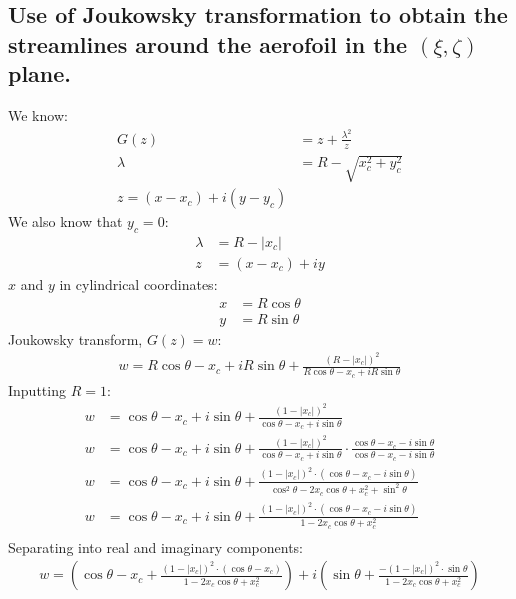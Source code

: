 \subsection{Use of Joukowsky transformation to obtain the streamlines around the aerofoil in the $\left(\xi, \zeta \right)$ plane.}
We know:
\begin{align}
    G(z)    & = z + \frac{\lambda^2}{z}  \\
    \lambda & = R - \sqrt{x_c^2 + y_c^2} \\
    z = \left(x-x_c\right) + i\left(y-y_c\right)
\end{align}
We also know that $y_c = 0$:
\begin{align}
    \lambda & = R - \left| x_c \right|  \\
    z       & = \left(x-x_c\right) + iy
\end{align}
$x$ and $y$ in cylindrical coordinates:
\begin{align}
    x & = R\cos\theta \\
    y & = R\sin\theta
\end{align}
Joukowsky transform, $G(z) = w$:
\begin{align}
    w = R\cos\theta - x_c + iR\sin\theta + \frac{\left(R-\left|x_c\right|\right)^2}{R\cos\theta - x_c + iR\sin\theta}
\end{align}
Inputting $R=1$:
\begin{align}
    w & = \cos\theta - x_c + i\sin\theta + \frac{\left(1-\left|x_c\right|\right)^2}{\cos\theta - x_c + i\sin\theta}                                                                             \\
    w & = \cos\theta - x_c + i\sin\theta + \frac{\left(1-\left|x_c\right|\right)^2}{\cos\theta - x_c + i\sin\theta} \cdot \frac{\cos\theta - x_c - i\sin\theta}{\cos\theta - x_c - i\sin\theta} \\
    w & = \cos\theta - x_c + i\sin\theta + \frac{\left(1-\left|x_c\right|\right)^2 \cdot \left(\cos\theta - x_c - i\sin\theta\right)}{\cos^2\theta -2x_c\cos\theta + x_c^2 + \sin^2\theta}      \\
    w & = \cos\theta - x_c + i\sin\theta + \frac{\left(1-\left|x_c\right|\right)^2 \cdot \left(\cos\theta - x_c - i\sin\theta\right)}{1 -2x_c\cos\theta + x_c^2}                                \\
\end{align}
Separating into real and imaginary components:
\begin{align}
    w = \left(\cos\theta - x_c + \frac{\left(1-\left|x_c\right|\right)^2 \cdot \left(\cos\theta - x_c\right)}{1 -2x_c\cos\theta + x_c^2}\right) + i\left(\sin\theta + \frac{-\left(1-\left|x_c\right|\right)^2 \cdot \sin\theta}{1 -2x_c\cos\theta + x_c^2}\right)
\end{align}
